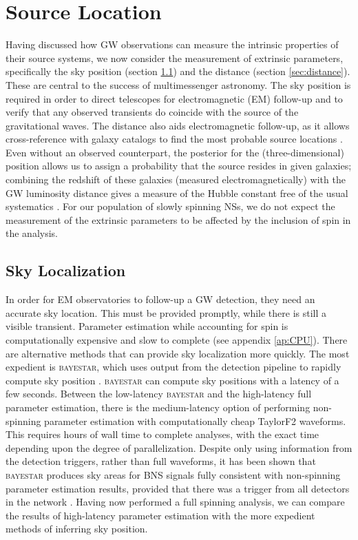 \section{Source Location}\label{sec:extrinsic}

Having discussed how GW observations can measure the intrinsic properties of their source systems, we now consider the measurement of extrinsic parameters, specifically the sky position (section \ref{sec:sky}) and the distance (section \ref{sec:distance}). These are central to the success of multimessenger astronomy. The sky position is required in order to direct telescopes for electromagnetic (EM) follow-up and to verify that any observed transients do coincide with the source of the gravitational waves. The distance also aids electromagnetic follow-up, as it allows cross-reference with galaxy catalogs to find the most probable source locations \citep{Nissanke_2012,Hanna:2013,Fan_2014,Blackburn:2014rqa}. Even without an observed counterpart, the posterior for the (three-dimensional) position allows us to assign a probability that the source resides in given galaxies; combining the redshift of these galaxies (measured electromagnetically) with the GW luminosity distance gives a measure of the Hubble constant free of the usual systematics \citep{Schutz_1986,Del_Pozzo_2012}. For our population of slowly spinning NSs, we do not expect the measurement of the extrinsic parameters to be affected by the inclusion of spin in the analysis.

\subsection{Sky Localization}\label{sec:sky}

In order for EM observatories to follow-up a GW detection, they need an accurate sky location. This must be provided promptly, while there is still a visible transient. Parameter estimation while accounting for spin is computationally expensive and slow to complete (see appendix \ref{ap:CPU}). There are alternative methods that can provide sky localization more quickly. The most expedient is \textsc{bayestar}, which uses output from the detection pipeline to rapidly compute sky position \citep{Singer:2015ema}. \textsc{bayestar} can compute sky positions with a latency of a few seconds. Between the low-latency \textsc{bayestar} and the high-latency full parameter estimation, there is the medium-latency option of performing non-spinning parameter estimation with computationally cheap TaylorF2 waveforms. This requires hours of wall time to complete analyses, with the exact time depending upon the degree of parallelization. Despite only using information from the detection triggers, rather than full waveforms, it has been shown that \textsc{bayestar} produces sky areas for BNS signals fully consistent with non-spinning parameter estimation results, provided that there was a trigger from all detectors in the network \citep{Singer_2014,Berry_2014,Singer:2015ema}. Having now performed a full spinning analysis, we can compare the results of high-latency parameter estimation with the more expedient methods of inferring sky position.


